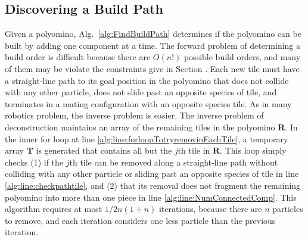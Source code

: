 




\subsection{Discovering a Build Path}

Given a polyomino, Alg.~\ref{alg:FindBuildPath} determines if the polyomino can be built by adding one component at a time.
 The forward problem of determining a build order is difficult because there are $O(n!)$ possible build orders, and many of them may be violate the constraints give in Section \label{subsc:model}.  
 Each new tile must have a straight-line path to its goal position in the polyomino that does not collide with any other particle, does not slide past an opposite species of tile, and terminates in a mating configuration with an opposite species tile.
As in many robotics problem, the inverse problem is easier.  
The inverse problem of deconstruction maintains an array of the remaining tiles in the polyomino $\mathbf{R}$. 
 In the inner for loop at line  \ref{alg:line:forloopTotryremovinEachTile}, a temporary array $\mathbf{T}$ is generated that contains all but the $j$th tile in $\mathbf{R}$.
This loop simply checks (1) if the $j$th tile can be removed along a straight-line path without  colliding with any other particle or sliding past an opposite species of tile in line \ref{alg:line:checkpathtile}, and (2) that its removal does not fragment the remaining polyomino into more than one piece in line \ref{alg:line:NumConnectedComp}. 
This algorithm requires at most  $1/2 n (1 + n)$ iterations, because there are $n$ particles to remove, and each iteration considers one less particle than the previous iteration.

